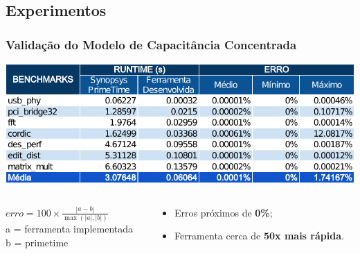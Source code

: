 \documentclass[10pt,a4paper]{beamer}
\begin{document}
		\subsection*{Experimentos}
		\begin{frame}[t]
			\frametitle{Validação do Modelo de Capacitância Concentrada}
			\begin{center}
				\includegraphics[width=\linewidth]{img/lumped_capacitance_vs_primetime.pdf} 
			\end{center}
			\begin{columns}
				\begin{column}{0.4\textwidth}
					\begin{shaded}
						$erro = 100 \times \frac{|a - b|}{\max(|a|, |b|)}$\\
						\small{a = ferramenta implementada} \\
						\small{b = primetime}
					\end{shaded}
				\end{column}
				\begin{column}{0.6\textwidth}
					\begin{itemize}
						\item Erros próximos de \textbf{0\%};
						\item Ferramenta cerca de \textbf{50x mais rápida}.
					\end{itemize}
				\end{column}
			\end{columns}
			
			
		\end{frame}
		
\end{document}
